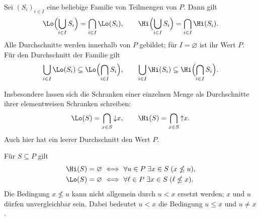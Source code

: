 \begin{theorem}
\label{b13guide:thm:family-bounds}
Sei $(S_i)_{i\in I}$ eine beliebige Familie von Teilmengen von $P$.
Dann gilt
\[
 \Lo\Bigl(\bigcup_{i\in I}S_i\Bigr)=\bigcap_{i\in I}\Lo(S_i),\qquad
 \Hi\Bigl(\bigcup_{i\in I}S_i\Bigr)=\bigcap_{i\in I}\Hi(S_i).
\]
Alle Durchschnitte werden innerhalb von $P$ gebildet;
für $I=\varnothing$ ist ihr Wert $P$.
Für den Durchschnitt der Familie gilt
\[
 \bigcup_{i\in I}\Lo(S_i)\subseteq
       \Lo\Bigl(\bigcap_{i\in I}S_i\Bigr),\qquad
 \bigcup_{i\in I}\Hi(S_i)\subseteq
       \Hi\Bigl(\bigcap_{i\in I}S_i\Bigr).
\]

Insbesondere lassen sich die Schranken einer einzelnen Menge als
Durchschnitte ihrer elementweisen Schranken schreiben:
\[
 \Lo(S)=\bigcap_{x\in S}\mathord\downarrow x,\qquad
 \Hi(S)=\bigcap_{x\in S}\mathord\uparrow x.
\]
Auch hier hat ein leerer Durchschnitt den Wert $P$.

\end{theorem}

\begin{theorem}
\label{b13guide:thm:unbounded}
Für $S\subseteq P$ gilt
\[
\begin{aligned}
 \Hi(S)=\varnothing
   &\ \Longleftrightarrow\ \forall u\in P\;\exists x\in S\;(x\nleq u),\\
 \Lo(S)=\varnothing
   &\ \Longleftrightarrow\ \forall \ell\in P\;\exists x\in S\;(\ell\nleq x).
\end{aligned}
\]
Die Bedingung $x\nleq u$ kann nicht allgemein durch $u<x$
ersetzt werden; $x$ und $u$ dürfen unvergleichbar sein.
Dabei bedeutet $u<x$ die Bedingung $u\leq x$ und $u\ne x$.
\end{theorem}
